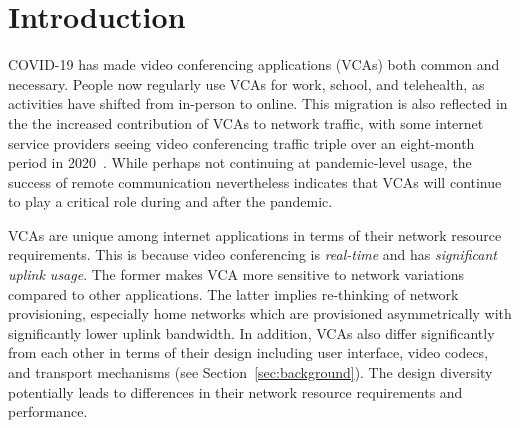 \section{Introduction}\label{sec:intro}
COVID-19 has made video conferencing applications (VCAs) both common and necessary. People now regularly use VCAs for work, school, and telehealth, as activities have shifted from in-person to online. This migration is also reflected in the the increased contribution of VCAs to network traffic, with some internet service providers seeing video conferencing traffic triple over an eight-month period in 2020~\cite{bitag_report}. While perhaps not continuing at pandemic-level usage, the success of remote communication nevertheless indicates that VCAs will continue to play a critical role during and after the pandemic.



VCAs are unique among internet applications in terms of their network resource requirements. This is because video conferencing is \textit{real-time} and has \textit{significant uplink usage}. The former makes VCA more sensitive to network variations compared to other applications. The latter implies re-thinking of network provisioning, especially home networks which are provisioned asymmetrically with significantly lower uplink bandwidth. In addition, VCAs also differ significantly from each other in terms of their design including user interface, video codecs, and transport mechanisms (see Section~\ref{sec:background}). The design diversity potentially leads to differences in their network resource requirements and performance.     %

